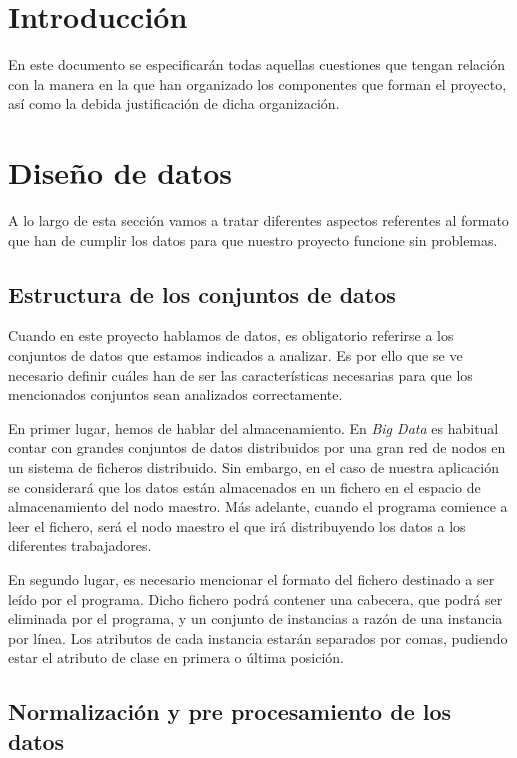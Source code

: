 
\section{Introducción}

En este documento se especificarán todas aquellas cuestiones que tengan relación con la manera en la que han organizado los componentes que forman el proyecto, así como la debida justificación de dicha organización.

\section{Diseño de datos}

A lo largo de esta sección vamos a tratar diferentes aspectos referentes al formato que han de cumplir los datos para que nuestro proyecto funcione sin problemas.

\subsection{Estructura de los conjuntos de datos}

Cuando en este proyecto hablamos de datos, es obligatorio referirse a los conjuntos de datos que estamos indicados a analizar. Es por ello que se ve necesario definir cuáles han de ser las características necesarias para que los mencionados conjuntos sean analizados correctamente.

En primer lugar, hemos de hablar del almacenamiento. En \textit{Big Data} es habitual contar con grandes conjuntos de datos distribuidos por una gran red de nodos en un sistema de ficheros distribuido. Sin embargo, en el caso de nuestra aplicación se considerará que los datos están almacenados en un fichero en el espacio de almacenamiento del nodo maestro. Más adelante, cuando el programa comience a leer el fichero, será el nodo maestro el que irá distribuyendo los datos a los diferentes trabajadores.

En segundo lugar, es necesario mencionar el formato del fichero destinado a ser leído por el programa. Dicho fichero podrá contener una cabecera, que podrá ser eliminada por el programa, y un conjunto de instancias a razón de una instancia por línea. Los atributos de cada instancia estarán separados por comas, pudiendo estar el atributo de clase en primera o última posición.

\subsection{Normalización y pre procesamiento de los datos}

